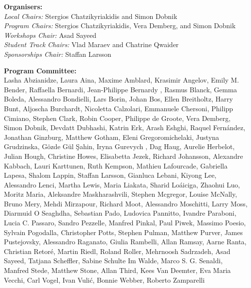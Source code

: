 \documentclass[a4paper,11pt,oneside]{book}
\begin{document}

\begin{description}

\item{\bf Organisers:}\vspace{2mm} \\
  \emph{Local Chairs:} Stergios Chatzikyriakidis and Simon Dobnik \\
  \emph{Program Chairs:} Stergios Chatzikyriakidis, Vera Demberg, and Simon Dobnik \\
  \emph{Workshops Chair:} Asad Sayeed \\
  \emph{Student Track Chairs:} Vlad Maraev and Chatrine Qwaider \\
  \emph{Sponsorships Chair:} Staffan Larsson \\
  
\vspace{3mm}
\item{\bf Program Committee:}\vspace{2mm} \\
Lasha Abzianidze, Laura Aina, Maxime Amblard, Krasimir Angelov, Emily M. Bender, Raffaella Bernardi, Jean-Philippe   Bernardy , Rasmus Blanck, Gemma   Boleda, Alessandro   Bondielli, Lars   Borin, Johan Bos, Ellen   Breitholtz, Harry Bunt, Aljoscha  Burchardt, Nicoletta Calzolari, Emmanuele Chersoni, Philipp Cimiano, Stephen  Clark, Robin Cooper, Philippe  de Groote, Vera   Demberg, Simon  Dobnik, Devdatt   Dubhashi, Katrin  Erk, Arash   Eshghi, Raquel  Fernández, Jonathan  Ginzburg, Matthew Gotham, Eleni   Gregoromichelaki, Justyna Grudzinska, Gözde Gül Şahin, Iryna  Gurevych , Dag  Haug, Aurelie   Herbelot, Julian  Hough, Christine  Howes, Elisabetta Jezek, Richard  Johansson, Alexandre Kabbach, Lauri  Karttunen, Ruth   Kempson, Mathieu  Lafourcade, Gabriella   Lapesa, Shalom  Lappin, Staffan   Larsson, Gianluca Lebani, Kiyong  Lee, Alessandro   Lenci, Martha   Lewis, Maria Liakata, Sharid   Loáiciga, Zhaohui Luo, Moritz  Maria, Aleksandre Maskharashvili, Stephen   Mcgregor, Louise  McNally, Bruno  Mery, Mehdi  Mirzapour, Richard   Moot, Alessandro  Moschitti, Larry  Moss, Diarmuid  O Seaghdha, Sebastian   Pado, Ludovica  Pannitto, Ivandre Paraboni, Lucia C.   Passaro, Sandro   Pezzelle, Manfred Pinkal, Paul Piwek, Massimo  Poesio, Sylvain   Pogodalla, Christopher  Potts, Stephen  Pulman, Matthew   Purver, James   Pustejovsky, Alessandro   Raganato, Giulia  Rambelli, Allan   Ramsay, Aarne   Ranta, Christian  Retoré, Martin  Riedl, Roland   Roller, Mehrnoosh Sadrzadeh, Asad   Sayeed, Tatjana   Scheffler, Sabine Schulte Im Walde, Marco S. G.   Senaldi, Manfred  Stede, Matthew  Stone, Allan Third, Kees  Van  Deemter, Eva Maria  Vecchi, Carl Vogel, Ivan  Vulić, Bonnie   Webber, Roberto   Zamparelli


\end{description}
\end{document}
